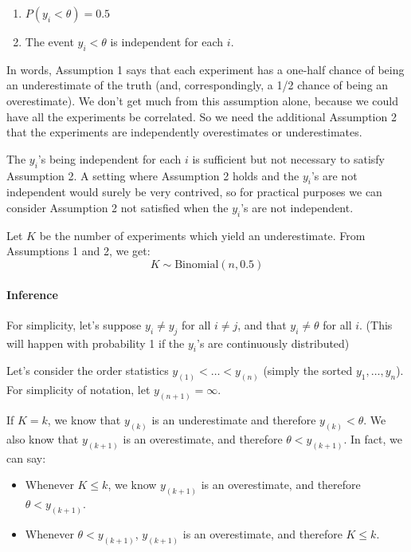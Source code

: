 \documentclass[letterpaper,12pt]{article}
\begin{document}
\begin{enumerate}
\item $P(y_i<\theta)=0.5$
\item The event $y_i<\theta$ is independent for each $i$.
\end{enumerate}

In words, Assumption 1 says that each experiment has a one-half chance of being an underestimate of the truth (and, correspondingly, a 1/2 chance of being an overestimate). We don't get much from this assumption alone, because we could have all the experiments be correlated. So we need the additional Assumption 2 that the experiments are independently overestimates or underestimates.

The $y_i$'s being independent for each $i$ is sufficient but not necessary to satisfy Assumption 2. A setting where Assumption 2 holds and the $y_i$'s are not independent would surely be very contrived, so for practical purposes we can consider Assumption 2 not satisfied when the $y_i$'s are not independent.

Let $K$ be the number of experiments which yield an underestimate. From Assumptions 1 and 2, we get:
\begin{equation*}K\sim\mathrm{Binomial}(n,0.5)\end{equation*}

\paragraph{Inference}\label{inference-3}

For simplicity, let's suppose $y_i\neq y_j$ for all $i\neq j$, and that $y_i\neq \theta$ for all $i$. (This will happen with probability 1 if the $y_i$'s are continuously distributed)

Let's consider the order statistics $y_{(1)}<\ldots< y_{(n)}$ (simply the sorted $y_1,\ldots,y_n$). For simplicity of notation, let $y_{(n+1)}=\infty$.

If $K=k$, we know that $y_{(k)}$ is an underestimate and therefore $y_{(k)}< \theta$. We also know that $y_{(k+1)}$ is an overestimate, and therefore $\theta < y_{(k+1)}$. In fact, we can say:

\begin{itemize}
\item
  Whenever $K\leq k$, we know $y_{(k+1)}$ is an overestimate, and therefore $\theta<y_{(k+1)}$.
\item
  Whenever $\theta<y_{(k+1)}$, $y_{(k+1)}$ is an overestimate, and therefore $K\leq k$.
\end{itemize}
\end{document}
